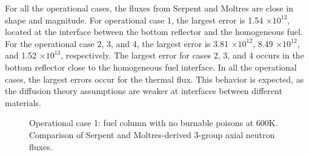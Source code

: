 For all the operational cases, the fluxes from Serpent and Moltres are close in shape and magnitude.
For operational case 1, the largest error is 1.54 $\times 10^{12}$, located at the interface between the bottom reflector and the homogeneous fuel.
For the operational case 2, 3, and 4, the largest error is 3.81 $\times 10^{12}$, 8.49 $\times 10^{12}$, and 1.52 $\times 10^{13}$, respectively.
The largest error for cases 2, 3, and 4 occurs in the bottom reflector close to the homogeneous fuel interface.
In all the operational cases, the largest errors occur for the thermal flux.
This behavior is expected, as the diffusion theory assumptions are weaker at interfaces between different materials.

\begin{figure}[htbp!]
	\centering
	\hfill
  \caption{Operational case 1: fuel column with no burnable poisons at 600K. Comparison of Serpent and Moltres-derived 3-group axial neutron fluxes.}
	\label{fig:assembly-noLBP-600-flux}
\end{figure}

